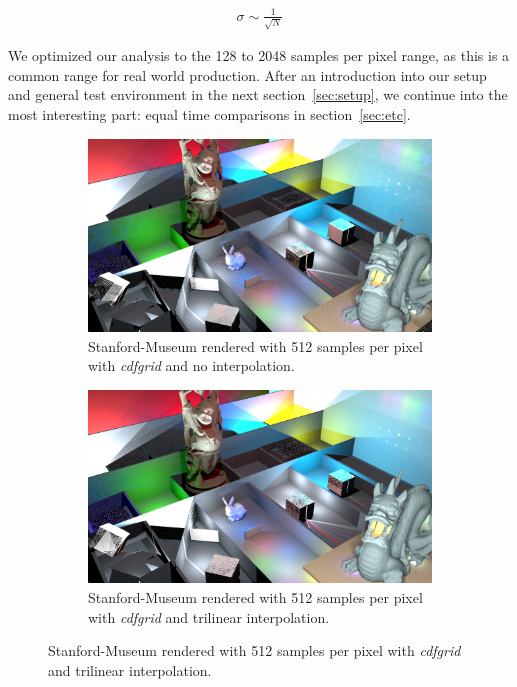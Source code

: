 \begin{align}\label{eq:sigmaCor}
\sigma \sim \frac{1}{\sqrt{N}}
\end{align}

We optimized our analysis to the 128 to 2048 samples per pixel range, as this is a common range for real world production. After an introduction into our setup and general test environment in the next section~\ref{sec:setup}, we continue into the most interesting part: equal time comparisons in section~\ref{sec:etc}.


\begin{figure}
\centering
\begin{subfigure}[b]{1\textwidth}
   \includegraphics[width=1\linewidth]{figures/examples/StanfordMuseum_pvox_ps512_t503_icdf-0_pc96000k_mc0,1_Vox96_8854.png}
   \caption{Stanford-Museum rendered with 512 samples per pixel with \textit{cdfgrid} and no interpolation.}
   \label{fig:SMnoInt} 
\end{subfigure}

\begin{subfigure}[b]{1\textwidth}
   \includegraphics[width=1\linewidth]{figures/examples/StanfordMuseum_pvox_ps512_t723_icdf-1_pc128000k_mc0,1_Vox64_17574.png}
   \caption{Stanford-Museum rendered with 512 samples per pixel with \textit{cdfgrid} and trilinear interpolation.}
   \label{fig:SMInt}
\end{subfigure}


\end{figure}
